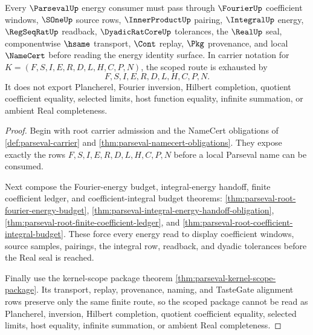 \begin{theorem}
\label{thm:parseval-scoped-energy-route}
Every $\ParsevalUp$ energy consumer must pass through $\FourierUp$ coefficient windows, $\SOneUp$ source rows, $\InnerProductUp$ pairing, $\IntegralUp$ energy, $\RegSeqRatUp$ readback, $\DyadicRatCoreUp$ tolerances, the $\RealUp$ seal, componentwise $\hsame$ transport, $\Cont$ replay, $\Pkg$ provenance, and local $\NameCert$ before reading the energy identity surface. In carrier notation for $K=(F,S,I,E,R,D,L,H,C,P,N)$, the scoped route is exhausted by
$$
F,S,I,E,R,D,L,H,C,P,N .
$$
It does not export Plancherel, Fourier inversion, Hilbert completion, quotient coefficient equality, selected limits, host function equality, infinite summation, or ambient Real completeness.
\end{theorem}
\begin{proof}
Begin with root carrier admission and the NameCert obligations of \autoref{def:parseval-carrier} and \autoref{thm:parseval-namecert-obligations}. They expose exactly the rows $F,S,I,E,R,D,L,H,C,P,N$ before a local Parseval name can be consumed.

Next compose the Fourier-energy budget, integral-energy handoff, finite coefficient ledger, and coefficient-integral budget theorems: \autoref{thm:parseval-root-fourier-energy-budget}, \autoref{thm:parseval-integral-energy-handoff-obligation}, \autoref{thm:parseval-root-finite-coefficient-ledger}, and \autoref{thm:parseval-root-coefficient-integral-budget}. These force every energy read to display coefficient windows, source samples, pairings, the integral row, readback, and dyadic tolerances before the Real seal is reached.

Finally use the kernel-scope package theorem \autoref{thm:parseval-kernel-scope-package}. Its transport, replay, provenance, naming, and TasteGate alignment rows preserve only the same finite route, so the scoped package cannot be read as Plancherel, inversion, Hilbert completion, quotient coefficient equality, selected limits, host equality, infinite summation, or ambient Real completeness.
\end{proof}

